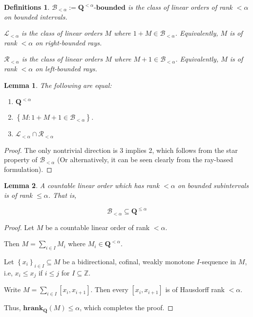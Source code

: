 \documentclass{article}
\newtheorem{lemma}{Lemma}
\newtheorem{definitions}{Definitions}
\newcommand{\braces}[1]{\left\{ {#1} \right\}}
\newcommand{\setcomp}[1]{\braces{#1}}
\newcommand{\hrank}[1]{\mathbf{hrank}_{\qq}\left( #1 \right)}
\newcommand{\bounded}[1]{{#1} \text{-} \mathbf{bounded}}
\newcommand{\qq}{\mathbf{Q}}
\newcommand{\ZZ}{\mathbb{Z}}
\begin{document}
\begin{definitions}
  $\mathcal{B}_{< \alpha} := \bounded{\qq^{< \alpha}}$ is the class
  of linear orders of rank $< \alpha$ on bounded intervals.

  $\mathcal{L}_{< \alpha}$ is the class
  of linear orders $M$ where $1 + M \in \mathcal{B}_{< \alpha}$.
  Equivalently, $M$ is of rank $< \alpha$ on right-bounded rays.

  $\mathcal{R}_{< \alpha}$ is the class
  of linear orders $M$ where $M + 1 \in \mathcal{B}_{< \alpha}$.
  Equivalently, $M$ is of rank $< \alpha$ on left-bounded rays.
\end{definitions}

\begin{lemma}
  The following are equal:

  \begin{enumerate}
    \item $\qq^{< \alpha}$
    \item $\setcomp{M : 1 + M + 1 \in \mathcal{B}_{< \alpha}}$.
    \item $\mathcal{L}_{< \alpha} \cap \mathcal{R}_{< \alpha}$
  \end{enumerate}

\end{lemma}

\begin{proof}
  The only nontrivial direction is 3 implies 2, which follows from the star property
  of $\mathcal{B}_{< \alpha}$ (Or alternatively, it can be seen clearly from the
  ray-based formulation).
\end{proof}

\begin{lemma}
  A countable linear order which has rank $< \alpha$
  on bounded subintervals is of rank $\le \alpha$.
  That is,

  $$\mathcal{B}_{< \alpha} \subseteq \qq^{\le \alpha}$$
\end{lemma}

\begin{proof}
  Let $M$ be a countable linear order of rank $< \alpha$.

  Then $M = \sum_{i \in I} M_i$ where $M_i \in \qq^{< \alpha}$.

  Let $\setcomp{x_i}_{i \in I} \subseteq M$ be a bidirectional, cofinal, weakly monotone $I$-sequence in $M$, i.e,
  $x_i \le x_j$ if $i \le j$ for $I \subseteq \ZZ$.

  Write $M = \sum_{i \in I} [x_i, x_{i+1}]$. Then every $[x_i, x_{i+1}]$ is of Hausdorff rank $< \alpha$.

  Thus, $\hrank{M} \le \alpha$, which completes the proof.
\end{proof}
\end{document}
